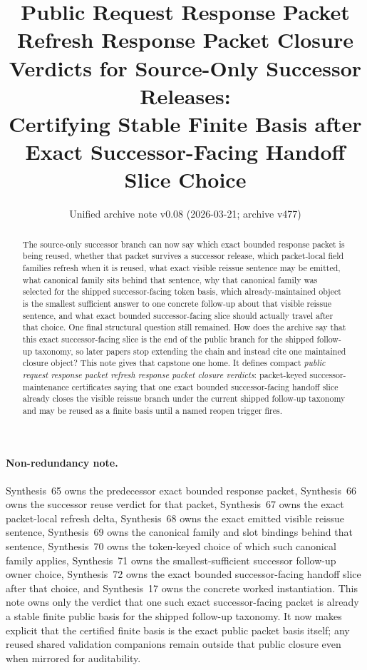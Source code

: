 \documentclass[11pt]{article}
\title{Public Request Response Packet Refresh Response Packet Closure Verdicts for Source-Only Successor Releases:\\[0.5ex]
\large Certifying Stable Finite Basis after Exact Successor-Facing Handoff Slice Choice}
\author{}
\date{Unified archive note v0.08 (2026-03-21; archive v477)}
\begin{document}
\maketitle

\begin{abstract}
The source-only successor branch can now say which exact bounded response packet is being reused, whether that packet survives a successor release, which packet-local field families refresh when it is reused, what exact visible reissue sentence may be emitted, what canonical family sits behind that sentence, why that canonical family was selected for the shipped successor-facing token basis, which already-maintained object is the smallest sufficient answer to one concrete follow-up about that visible reissue sentence, and what exact bounded successor-facing slice should actually travel after that choice. One final structural question still remained. How does the archive say that this exact successor-facing slice is the end of the public branch for the shipped follow-up taxonomy, so later papers stop extending the chain and instead cite one maintained closure object? This note gives that capstone one home. It defines compact \emph{public request response packet refresh response packet closure verdicts}: packet-keyed successor-maintenance certificates saying that one exact bounded successor-facing handoff slice already closes the visible reissue branch under the current shipped follow-up taxonomy and may be reused as a finite basis until a named reopen trigger fires.
\end{abstract}

\paragraph{Non-redundancy note.}
Synthesis~65 owns the predecessor exact bounded response packet, Synthesis~66 owns the successor reuse verdict for that packet, Synthesis~67 owns the exact packet-local refresh delta, Synthesis~68 owns the exact emitted visible reissue sentence, Synthesis~69 owns the canonical family and slot bindings behind that sentence, Synthesis~70 owns the token-keyed choice of which such canonical family applies, Synthesis~71 owns the smallest-sufficient successor follow-up owner choice, Synthesis~72 owns the exact bounded successor-facing handoff slice after that choice, and Synthesis~17 owns the concrete worked instantiation.\cite{series:publicrequestresponsepackets,series:publicrequestresponsepacketcarryforward,series:publicrequestresponsepacketdeltas,series:publicrequestresponsepacketrefreshnotices,series:publicrequestresponsepacketrefreshnoticenormalforms,series:publicrequestresponsepacketrefreshnoticeselections,series:publicrequestresponsepacketrefreshresponsemenus,series:publicrequestresponsepacketrefreshresponsepackets,series:workedexample}
This note owns only the verdict that one such exact successor-facing packet is already a stable finite public basis for the shipped follow-up taxonomy. It now makes explicit that the certified finite basis is the exact public packet basis itself; any reused shared validation companions remain outside that public closure even when mirrored for auditability.
\end{document}

